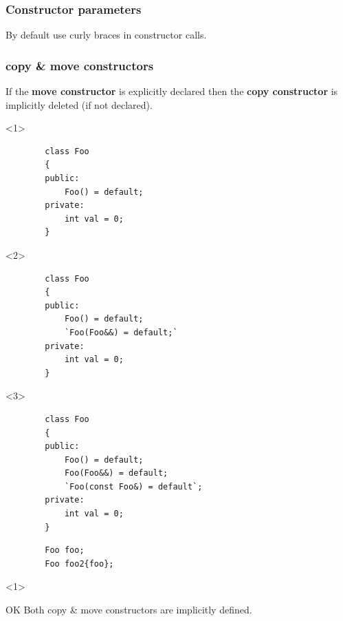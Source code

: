 \documentclass{beamer}
\begin{document}
\begin{frame}
\frametitle{Constructor parameters}
    \begin{center}
        By default use curly braces in constructor calls.
    \end{center}
\end{frame}

\begin{frame}[fragile]
\frametitle{copy \& move constructors}
    If the \textbf{move constructor} is explicitly declared then the \textbf{copy constructor} is
    implicitly deleted (if not declared).
\end{frame}

\begin{frame}[fragile,t]
    \begin{onlyenv}<1>
    \begin{lstlisting}
        class Foo
        {
        public:
            Foo() = default;
        private:
            int val = 0;
        }
    \end{lstlisting}
    \end{onlyenv}

    \begin{onlyenv}<2>
    \begin{lstlisting}
        class Foo
        {
        public:
            Foo() = default;
            `Foo(Foo&&) = default;`
        private:
            int val = 0;
        }
    \end{lstlisting}
    \end{onlyenv}

    \begin{onlyenv}<3>
    \begin{lstlisting}
        class Foo
        {
        public:
            Foo() = default;
            Foo(Foo&&) = default;
            `Foo(const Foo&) = default`;
        private:
            int val = 0;
        }
    \end{lstlisting}
    \end{onlyenv}

    \hrulefill
    \begin{lstlisting}
        Foo foo;
        Foo foo2{foo};
    \end{lstlisting}

    \begin{onlyenv}<1>
        \begin{block}{OK}
            Both copy \& move constructors are implicitly defined.
        \end{block}
    \end{onlyenv}


\end{frame}
\end{document}

